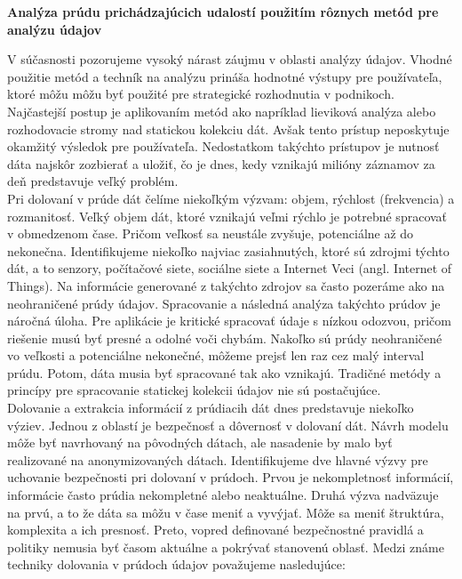 \documentclass[11pt]{article}
\begin{document}
\begin{center}
	{\LARGE \textbf{Analýza prúdu prichádzajúcich udalostí použitím rôznych metód pre analýzu údajov}}
\end{center}
V súčasnosti pozorujeme vysoký nárast záujmu v oblasti analýzy údajov. Vhodné použitie metód a techník na analýzu prináša hodnotné výstupy pre používateľa, ktoré môžu môžu byť použité pre strategické rozhodnutia v podnikoch. Najčastejší postup je aplikovaním metód ako napríklad lieviková analýza alebo rozhodovacie stromy nad statickou kolekciu dát. Avšak tento prístup neposkytuje okamžitý výsledok pre používateľa. Nedostatkom takýchto prístupov je nutnosť dáta najskôr zozbierať a uložiť, čo je dnes, kedy vznikajú milióny záznamov za deň predstavuje veľký problém.
\newline
\\
Pri dolovaní v prúde dát čelíme niekoľkým výzvam: objem,  rýchlost (frekvencia) a rozmanitosť. Veľký objem dát, ktoré vznikajú veľmi rýchlo je potrebné spracovať v obmedzenom čase. Pričom veľkosť sa neustále zvyšuje, potenciálne až do nekonečna. Identifikujeme niekoľko najviac zasiahnutých, ktoré sú zdrojmi týchto dát, a to senzory, počítačové siete, sociálne siete a Internet Veci (angl. Internet of Things). Na informácie generované z takýchto zdrojov sa často pozeráme ako na neohraničené prúdy údajov. Spracovanie a následná analýza takýchto prúdov je náročná úloha. Pre aplikácie je kritické spracovať údaje s nízkou odozvou, pričom riešenie musú byť presné a odolné voči chybám. Nakoľko sú prúdy neohraničené vo veľkosti a potenciálne nekonečné, môžeme prejsť len raz cez malý interval prúdu. Potom, dáta musia byť spracované tak ako vznikajú. Tradičné metódy a princípy pre spracovanie statickej kolekcii údajov nie sú postačujúce. 
\newline
\\
Dolovanie a extrakcia informácií z prúdiacih dát dnes predstavuje niekoľko výziev. Jednou z oblastí je bezpečnosť a dôvernosť v dolovaní dát. Návrh modelu môže byť navrhovaný na pôvodných dátach, ale nasadenie by malo byť realizované na anonymizovaných dátach. Identifikujeme dve hlavné výzvy pre uchovanie bezpečnosti pri dolovaní v prúdoch. Prvou je nekompletnosť informácií, informácie často prúdia nekompletné alebo neaktuálne. Druhá výzva nadväzuje na prvú, a to že dáta sa môžu v čase meniť a vyvýjať. Môže sa meniť štruktúra, komplexita a ich presnosť. Preto, vopred definované bezpečnostné pravidlá a politiky nemusia byť časom aktuálne a pokrývať stanovenú oblasť. Medzi známe techniky dolovania v prúdoch údajov považujeme nasledujúce:
\end{document}
